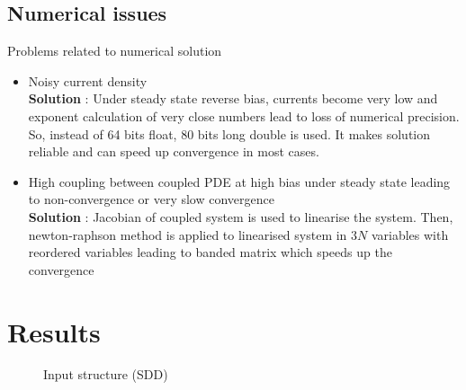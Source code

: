 \documentclass{beamer}
\begin{document}
\subsection{Numerical issues}
\begin{frame}{Problems related to numerical solution}
\begin{itemize}
\item Noisy current density\\ 
\textbf{Solution} : Under steady state reverse bias, currents become very low and exponent calculation of very close numbers lead to loss of numerical precision. So, instead of 64 bits float, 80 bits long double is used. It makes solution reliable and can speed up convergence in most cases.

\item High coupling between coupled PDE at high bias under steady state leading to non-convergence or very slow convergence\\
\textbf{Solution} : Jacobian of coupled system is used to linearise the system. Then, newton-raphson method is applied to linearised system in $3N$ variables with reordered variables leading to banded matrix which speeds up the convergence
 
\end{itemize}
\end{frame}

\section{Results}

\begin{frame}
\begin{figure}[h!]
\caption{Input structure (SDD)}
\label{fig:SDD}
\end{figure}
\end{frame}
\end{document}
